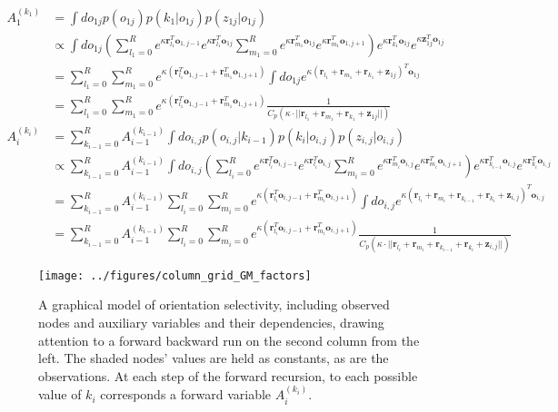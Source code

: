 \documentclass[11pt]{article}
\begin{document}
\begin{align*}
A_1^{(k_1)} &= \int do_{1j} p(o_{1j}) p(k_1|o_{1j}) p(z_{1j}|o_{1j}) \\
&\propto \int do_{1j} \left( \sum_{l_1=0}^R e^{\kappa \mathbf{r}_{l_1}^T \mathbf{o}_{1,j-1}}e^{\kappa \mathbf{r}_{l_1}^T \mathbf{o}_{1j}} \sum_{m_1=0}^R e^{\kappa \mathbf{r}_{m_1}^T \mathbf{o}_{1j}} e^{\kappa \mathbf{r}_{m_1}^T \mathbf{o}_{1,j+1}} \right) e^{\kappa \mathbf{r}_{k_1}^T \mathbf{o}_{1j}} e^{\kappa \mathbf{z}_{1j}^T\mathbf{o}_{1j}} \\
&= \sum_{l_1=0}^R \sum_{m_1=0}^R e^{\kappa (\mathbf{r}_{l_1}^T\mathbf{o}_{1,j-1}+\mathbf{r}_{m_1}^T\mathbf{o}_{1,j+1})} \int do_{1j} e^{\kappa(\mathbf{r}_{l_1}+\mathbf{r}_{m_1}+\mathbf{r}_{k_1}+\mathbf{z}_{1j})^T\mathbf{o}_{1j}} \\
&= \sum_{l_1=0}^R \sum_{m_1=0}^R e^{\kappa (\mathbf{r}_{l_1}^T\mathbf{o}_{1,j-1}+\mathbf{r}_{m_1}^T\mathbf{o}_{1,j+1})} \frac{1}{C_p(\kappa\cdot ||\mathbf{r}_{l_1}+\mathbf{r}_{m_1}+\mathbf{r}_{k_1}+\mathbf{z}_{1j}||)} \\
A_i^{(k_i)} &= \sum_{k_{i-1}=0}^R A_{i-1}^{(k_{i-1})} \int do_{i,j} p(o_{i,j}|k_{i-1})p(k_i|o_{i,j})p(z_{i,j}|o_{i,j}) \\
&\propto \sum_{k_{i-1}=0}^R A_{i-1}^{(k_{i-1})} \int do_{i,j} \left( \sum_{l_i=0}^R e^{\kappa\mathbf{r}_{l_i}^T\mathbf{o}_{i,j-1}} e^{\kappa\mathbf{r}_{l_i}^T\mathbf{o}_{i,j}} \sum_{m_i=0}^R e^{\kappa\mathbf{r}_{m_i}^T\mathbf{o}_{i,j}} e^{\kappa\mathbf{r}_{m_i}^T\mathbf{o}_{i,j+1}}\right) e^{\kappa \mathbf{r}_{k_{i-1}}^T \mathbf{o}_{i,j}} e^{\kappa \mathbf{r}_{k_i}^T \mathbf{o}_{i,j}} \\
&= \sum_{k_{i-1}=0}^R A_{i-1}^{(k_{i-1})} \sum_{l_i=0}^R \sum_{m_i=0}^R e^{\kappa\left(\mathbf{r}_{l_i}^T\mathbf{o}_{i,j-1}+\mathbf{r}_{m_i}^T\mathbf{o}_{i,j+1}\right)} \int do_{i,j} e^{\kappa(\mathbf{r}_{l_i}+\mathbf{r}_{m_i}+\mathbf{r}_{k_{i-1}}+\mathbf{r}_{k_i}+\mathbf{z}_{i,j})^T\mathbf{o}_{i,j}} \\
&= \sum_{k_{i-1}=0}^R A_{i-1}^{(k_{i-1})} \sum_{l_i=0}^R \sum_{m_i=0}^R e^{\kappa\left(\mathbf{r}_{l_i}^T\mathbf{o}_{i,j-1}+\mathbf{r}_{m_i}^T\mathbf{o}_{i,j+1}\right)} \frac{1}{C_p(\kappa\cdot ||\mathbf{r}_{l_i}+\mathbf{r}_{m_i}+\mathbf{r}_{k_{i-1}}+\mathbf{r}_{k_i}+\mathbf{z}_{i,j}||)} 
\end{align*}

\begin{figure}[h]
\centering
\texttt{[image: ../figures/column\_grid\_GM\_factors]}
\caption{A graphical model of orientation selectivity, including observed nodes and auxiliary variables and their dependencies, drawing attention to a forward backward run on the second column from the left. The shaded nodes' values are held as constants, as are the observations. At each step of the forward recursion, to each possible value of $k_i$ corresponds a forward variable $A_i^{(k_i)}$.}
\label{fig:som_gm3}
\end{figure}
\end{document}
